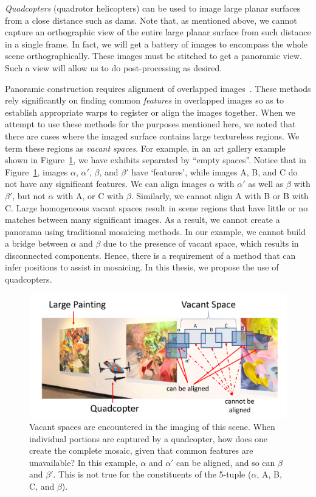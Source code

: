 \emph{Quadcopters} (quadrotor helicopters) can be used to image large
planar surfaces from a close distance such as dams. Note that, as
mentioned above, we cannot capture an orthographic view of the entire
large planar surface from such distance in a single frame. In fact, we
will get a battery of images to encompass the whole scene
orthographically. These images must be stitched to get a panoramic
view.  Such a view will allow us to do post-processing as desired.

Panoramic construction requires alignment of overlapped
images~\cite{Brown03}.  These methods rely significantly on finding
common \textit{features} in overlapped images so as to establish
appropriate warps to register or align the images together. When we
attempt to use these methods for the purposes mentioned here, we noted
that there are cases where the imaged surface contains large textureless
regions. We term these regions as \emph{vacant spaces}. For example, in an art
gallery example shown in Figure~\ref{fig:indoor}, we have exhibits separated by
``empty spaces''. Notice that in Figure~\ref{fig:indoor}, images $\alpha$,
$\alpha'$, $\beta$, and $\beta'$ have `features', while images A, B, and C do
not have any significant features.  We can align images $\alpha$ with $\alpha
'$ as well as $\beta$ with $\beta '$, but not $\alpha$ with A, or C with
$\beta$.  Similarly, we cannot align A with B or B with C. Large homogeneous
vacant spaces result in scene regions that have little or no matches between
many significant images. As a result, we cannot create a panorama using
traditional mosaicing methods. In our example, we cannot build a bridge between
$\alpha$ and $\beta$ due to the presence of vacant space, which results in
disconnected components. Hence, there is a requirement of a method that can
infer positions to assist in mosaicing.  In this thesis, we propose the use of
quadcopters.

\begin{figure}[h!]
\centering
\includegraphics[width=0.98\linewidth]{figures/vacantSpaces/indoor}
\caption[Vacant spaces problem in art gallery]{Vacant spaces are
  encountered in the imaging of this scene. When individual portions
  are captured by a quadcopter, how does one create the complete
  mosaic, given that common features are unavailable? In this example,
  $\alpha$ and $\alpha '$ can be aligned, and so can $\beta$ and
  $\beta '$. This is not true for the constituents of the 5-tuple ($\alpha$, A,
  B, C, and $\beta$).}
\label{fig:indoor}
\end{figure}
    

